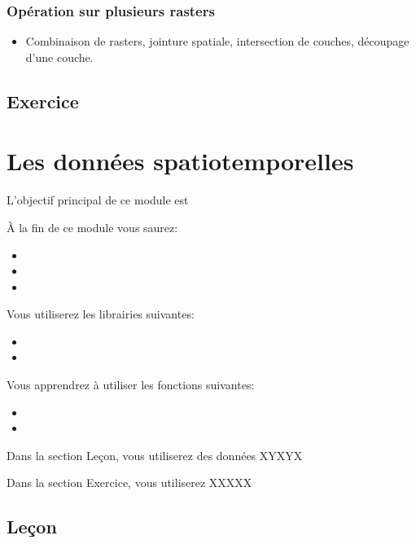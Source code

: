 \documentclass[
  12pt,
]{krantz}
\providecommand{\tightlist}{%
  \setlength{\itemsep}{0pt}\setlength{\parskip}{0pt}}
\begin{document}
\hypertarget{opuxe9ration-sur-plusieurs-rasters}{%
\subsection{Opération sur plusieurs rasters}\label{opuxe9ration-sur-plusieurs-rasters}}

\begin{itemize}
\tightlist
\item
  Combinaison de rasters, jointure spatiale, intersection de couches, découpage d'une couche.
\end{itemize}

\hypertarget{exercice-6}{%
\section{Exercice}\label{exercice-6}}

\hypertarget{spatiotemp}{%
\chapter{Les données spatiotemporelles}\label{spatiotemp}}

L'objectif principal de ce module est

À la fin de ce module vous saurez:

\begin{itemize}
\item
\item
\item
\end{itemize}

Vous utiliserez les librairies suivantes:

\begin{itemize}
\item
\item
\end{itemize}

Vous apprendrez à utiliser les fonctions suivantes:

\begin{itemize}
\item
\item
\end{itemize}

Dans la section Leçon, vous utiliserez des données XYXYX

Dans la section Exercice, vous utiliserez XXXXX

\hypertarget{leuxe7on-7}{%
\section{Leçon}\label{leuxe7on-7}}
\end{document}
